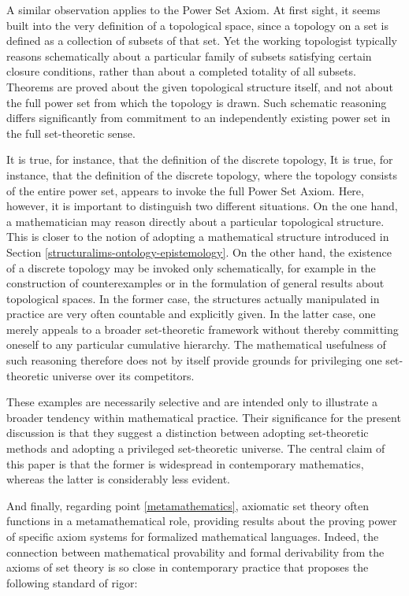 \documentclass[11pt,a4paper]{article}
\begin{document}
A similar observation applies to the Power Set Axiom. At first sight, it seems built into the very definition of a topological space, since a topology on a set is defined as a collection of subsets of that set. Yet the working topologist typically reasons schematically about a particular family of subsets satisfying certain closure conditions, rather than about a completed totality of all subsets. Theorems are proved about the given topological structure itself, and not about the full power set from which the topology is drawn. Such schematic reasoning differs significantly from commitment to an independently existing power set in the full set-theoretic sense.

It is true, for instance, that the definition of the discrete topology, It is true, for instance, that the definition of the discrete topology, where the topology consists of the entire power set, appears to invoke the full Power Set Axiom. Here, however, it is important to distinguish two different situations. On the one hand, a mathematician may reason directly about a particular topological structure. This is closer to the notion of adopting a mathematical structure introduced in Section \ref{structuralims-ontology-epistemology}. On the other hand, the existence of a discrete topology may be invoked only schematically, for example in the construction of counterexamples or in the formulation of general results about topological spaces. In the former case, the structures actually manipulated in practice are very often countable and explicitly given. In the latter case, one merely appeals to a broader set-theoretic framework without thereby committing oneself to any particular cumulative hierarchy. The mathematical usefulness of such reasoning therefore does not by itself provide grounds for privileging one set-theoretic universe over its competitors.

These examples are necessarily selective and are intended only to illustrate a broader tendency within mathematical practice. Their significance for the present discussion is that they suggest a distinction between adopting set-theoretic methods and adopting a privileged set-theoretic universe. The central claim of this paper is that the former is widespread in contemporary mathematics, whereas the latter is considerably less evident.

And finally, regarding point \ref{metamathematics}, axiomatic set theory often functions in a metamathematical role, providing results about the proving power of specific axiom systems for formalized mathematical languages. Indeed, the connection between mathematical provability and formal derivability from the axioms of set theory is so close in contemporary practice that \textcite[373]{maclane1986mathematics} proposes the following standard of rigor:
\end{document}
